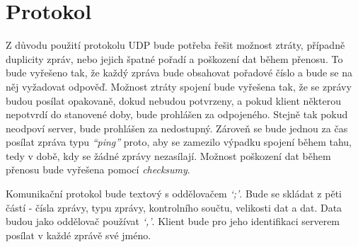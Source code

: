 \documentclass[12pt, a4paper]{article}
\begin{document}
	\section{Protokol}
	Z důvodu použití protokolu UDP bude potřeba řešit možnost ztráty, případně duplicity zpráv, nebo jejich špatné pořadí a poškození dat během přenosu. To bude vyřešeno tak, že každý zpráva bude obsahovat pořadové číslo a bude se na něj vyžadovat odpověď. Možnost ztráty spojení bude vyřešena tak, že se zprávy budou posílat opakovaně, dokud nebudou potvrzeny, a pokud klient některou nepotvrdí do stanovené doby, bude prohlášen za odpojeného. Stejně tak pokud neodpoví server, bude prohlášen za nedostupný. Zároveň se bude jednou za čas posílat zpráva typu \emph{“ping”} proto, aby se zamezilo výpadku spojení během tahu, tedy v době, kdy se žádné zprávy nezasílají. Možnost poškození dat během přenosu bude vyřešena pomocí \emph{checksumy}.

	Komunikační protokol bude textový s oddělovačem \emph{‘;’}. Bude se skládat z pěti částí - čísla zprávy, typu zprávy, kontrolního součtu, velikosti dat a dat. Data budou jako oddělovač používat \emph{‘,’}. Klient bude pro jeho identifikaci serverem posílat v každé zprávě své jméno.
	
\end{document}
